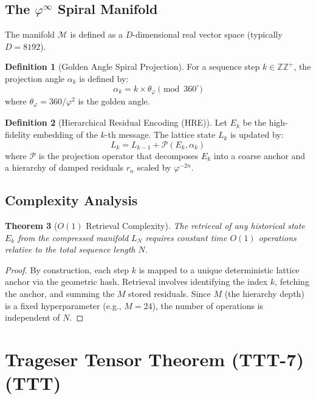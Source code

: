 \documentclass[11pt,a4paper,oneside]{article}
\newtheorem{theorem}{Theorem}[section]
\theoremstyle{definition}
\newtheorem{definition}[theorem]{Definition}
\theoremstyle{remark}
\newcommand{\phiinf}{\varphi^\infty}
\begin{document}
\subsection{The $\phiinf$ Spiral Manifold}

The manifold $\mathcal{M}$ is defined as a $D$-dimensional real vector space (typically $D=8192$). 

\begin{definition}[Golden Angle Spiral Projection]
For a sequence step $k \in \mathbb{ZZ}^+$, the projection angle $\alpha_k$ is defined by:
\begin{equation}
    \alpha_k = k \times \theta_\varphi \pmod{360^\circ}
\end{equation}
where $\theta_\varphi = 360/\varphi^2$ is the golden angle.
\end{definition}

\begin{definition}[Hierarchical Residual Encoding (HRE)]
Let $E_k$ be the high-fidelity embedding of the $k$-th message. The lattice state $L_k$ is updated by:
\begin{equation}
    L_k = L_{k-1} + \mathcal{P}(E_k, \alpha_k)
\end{equation}
where $\mathcal{P}$ is the projection operator that decomposes $E_k$ into a coarse anchor and a hierarchy of damped residuals $r_n$ scaled by $\varphi^{-2n}$.
\end{definition}

\subsection{Complexity Analysis}

\begin{theorem}[$O(1)$ Retrieval Complexity]
The retrieval of any historical state $E_k$ from the compressed manifold $L_N$ requires constant time $O(1)$ operations relative to the total sequence length $N$.
\end{theorem}

\begin{proof}
By construction, each step $k$ is mapped to a unique deterministic lattice anchor via the geometric hash. Retrieval involves identifying the index $k$, fetching the anchor, and summing the $M$ stored residuals. Since $M$ (the hierarchy depth) is a fixed hyperparameter (e.g., $M=24$), the number of operations is independent of $N$.
\end{proof}

\section{Trageser Tensor Theorem (TTT-7) (TTT)}
\end{document}
